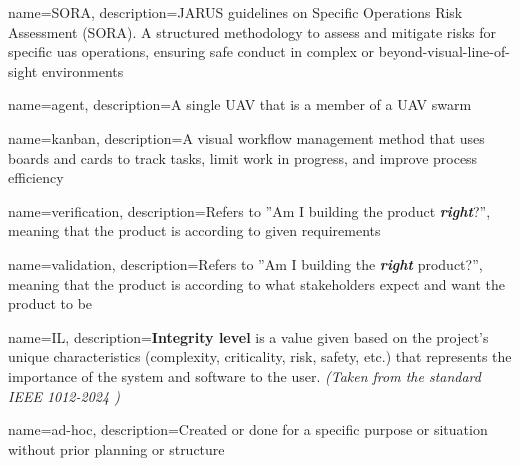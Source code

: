 {
        name=SORA,
        description={JARUS guidelines on Specific Operations Risk Assessment (SORA). A structured methodology to assess and mitigate risks for specific \acrshort{uas} operations, ensuring safe conduct in complex or beyond-visual-line-of-sight environments}
}


{
        name=agent,
        description={A single UAV that is a member of a UAV swarm}
}

{
        name=kanban,
        description={A visual workflow management method that uses boards and cards to track tasks, limit work in progress, and improve process efficiency}
}

{
        name=verification,
        description={Refers to ''Am I building the product \textbf{\textit{right}}?'', meaning that the product is according to given requirements}
}

{
        name=validation,
        description={Refers to ''Am I building the \textbf{\textit{right}} product?'', meaning that the product is according to what stakeholders expect and want the product to be}
}

{
		name=IL,
		description={\textbf{Integrity level} is a value given based on the project's unique characteristics (complexity, criticality, risk, safety, etc.) that represents the importance of the system and software to the user. \textit{(Taken from the standard IEEE 1012-2024 \cite{1012-2024})}}
}

{
        name=ad-hoc,
        description={Created or done for a specific purpose or situation without prior planning or structure}
}




